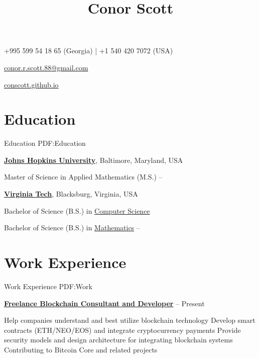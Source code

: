 \documentclass[a4paper,10pt,oneside]{article}
\begin{document}
\begin{minipage}[t][0pt]{\linewidth}


\title{Conor Scott}

\begin{subtitle}
+995 599 54 18 65 (Georgia) | +1 540 420 7072 (USA)
\par
\href{mailto:conor.r.scott.88@gmail.com}
{conor.r.scott.88@gmail.com}
\par
\href{https://conscott.github.io}
{conscott.github.io}
\end{subtitle}
\begin{body}


\section
{Education}
{Education}
{PDF:Education}

\href{https://www.jhu.edu/}
{\textbf{Johns Hopkins University}},
Baltimore, Maryland, USA

\SmallEntryGap
Master of Science in Applied Mathematics (M.S.)
\hfill
{} --

\EntryGap
\href{https://www.vt.edu/}
{\textbf{Virginia Tech}},
Blacksburg, Virginia, USA
\par
Bachelor of Science (B.S.) in
\href{https://www.cs.vt.edu/}
{Computer Science}
\par
Bachelor of Science (B.S.) in
\href{https://www.math.vt.edu/}
{Mathematics}
\hfill
{} --

\section
{Work Experience}
{Work Experience}
{PDF:Work}

\href{https://conscott.github.io}
{\textbf{Freelance Blockchain Consultant and Developer}}
\hfill
{} -- Present
\begin{detail}
\BulletItem Help companies understand and best utilize blockchain technology
\BulletItem Develop smart contracts (ETH/NEO/EOS) and integrate cryptocurrency payments
\BulletItem Provide security models and design architecture for integrating blockchain systems
\BulletItem Contributing to Bitcoin Core and related projects
\end{detail}



\end{body}
\end{minipage}
\end{document}
